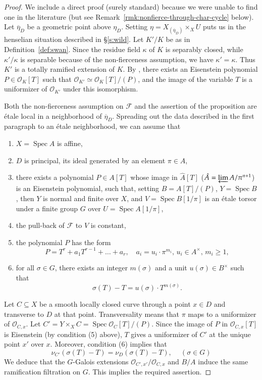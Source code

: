 \documentclass[twoside]{amsart}
\newcommand{\Ff}{\mathscr{F}}
\newcommand{\Oo}{\mathscr{O}}
\DeclareMathOperator{\Spec}{Spec}
\newcommand{\isom}{\simeq}
\renewcommand{\bar}{\overline}
\theoremstyle{plain}
\theoremstyle{definition}
\theoremstyle{remark}
\numberwithin{equation}{subsection}
\begin{document}
\begin{proof}
We include a direct proof (surely standard) because we were unable to find one in the literature (but see Remark~\ref{rmk:nonfierce-through-char-cycle} below). Let $\bar\eta_D$ be a geometric point above $\eta_D$. Setting $\eta = X_{(\bar\eta_D)}\times_X U$ puts us in the henselian situation described in \S\ref{s:wild}. Let $K'/K$ be as in Definition~\ref{def:swan}. Since the residue field $\kappa$ of $K$ is separably closed, while $\kappa'/\kappa$ is separable because of the non-fierceness assumption, we have $\kappa'=\kappa$. Thus $K'$ is a totally ramified extension of $K$. By \cite[I \S 6]{SerreCorpsLocaux}, there exists an Eisenstein polynomial $P\in \Oo_K[T]$ such that $\Oo_{K'} \isom \Oo_K[T]/(P)$, and the image of the variable $T$ is a uniformizer of $\Oo_{K'}$ under this isomorphism.  

Both the non-fierceness assumption on $\Ff$ and the assertion of the proposition are \'etale local in a neighborhood of $\bar\eta_D$. Spreading out the data described in the first paragraph to an \'etale neighborhood, we can assume that
\begin{enumerate}[(1)]
	\item $X=\Spec A$ is affine,
	\item $D$ is principal, its ideal generated by an element $\pi\in A$,
	\item there exists a polynomial $P\in A[T]$ whose image in $\hat A[T]$ ($\hat A = \varprojlim A/\pi^{n+1}$) is an Eisenstein polynomial, such that, setting $B=A[T]/(P)$, $Y=\Spec B$, then $Y$ is normal and finite over $X$, and $V=\Spec B[1/\pi]$ is an \'etale torsor under a finite group $G$ over $U = \Spec A[1/\pi]$, 
	\item the pull-back of $\Ff$ to $V$ is constant,
	\item the polynomial $P$ has the form
		\[
			P = T^r + a_1 T^{r-1} + \ldots + a_r, 
			\quad
			a_i= u_i\cdot \pi^{m_i}, \, u_i\in A^\times, \, m_i \geq 1,
		\] 
	\item for all $\sigma\in G$, there exists an integer $m(\sigma)$ and a unit $u(\sigma)\in B^\times$ such that 
		\[ 
			\sigma(T) - T = u(\sigma)\cdot T^{m(\sigma)}.
		\]
\end{enumerate}

Let $C\subseteq X$ be a smooth locally closed curve through a point $x\in D$ and transverse to $D$ at that point. Transversality means that $\pi$ maps to a uniformizer of $\Oo_{C, x}$.  Let $C' = Y\times_X C = \Spec \Oo_C[T]/(P)$. Since the image of $P$ in $\Oo_{C, x}[T]$ is Eisenstein (by condition (5) above), $T$ gives a uniformizer of $C'$ at the unique point $x'$ over $x$. Moreover, condition (6) implies that
\[ 
	\nu_{C'}(\sigma(T)-T) = \nu_D(\sigma(T)-T), 
	\quad
	\
	(\sigma \in G)
\]
We deduce that the $G$-Galois extensions $\Oo_{C',x'}/\Oo_{C,x}$ and $B/A$ induce the same ramification filtration on $G$. This implies the required assertion. 
\end{proof}
\end{document}
